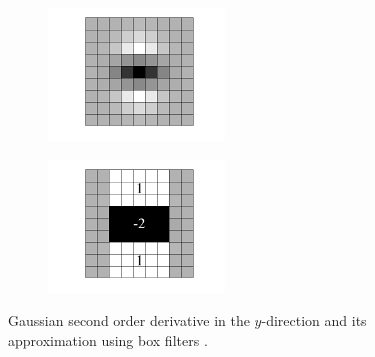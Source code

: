 \begin{figure}
    \centering
    \begin{subfigure}{0.24\textwidth}
        \centering
        \includegraphics[width=\textwidth]{Figures/surf/y_gauss.png}
        \label{fig:y_gauss}
    \end{subfigure}
    \begin{subfigure}{0.24\textwidth}
        \centering
        \includegraphics[width=\textwidth]{Figures/surf/y_box.png}
        \label{fig:y_box}
    \end{subfigure}
    \caption[Gaussian second-order derivative in the $y$-direction and its approximation using box filters]{Gaussian second order derivative in the $y$-direction and its approximation using box filters \cite{Bay2006}.}
    \label{fig:Gauss_box_y}
\end{figure}

